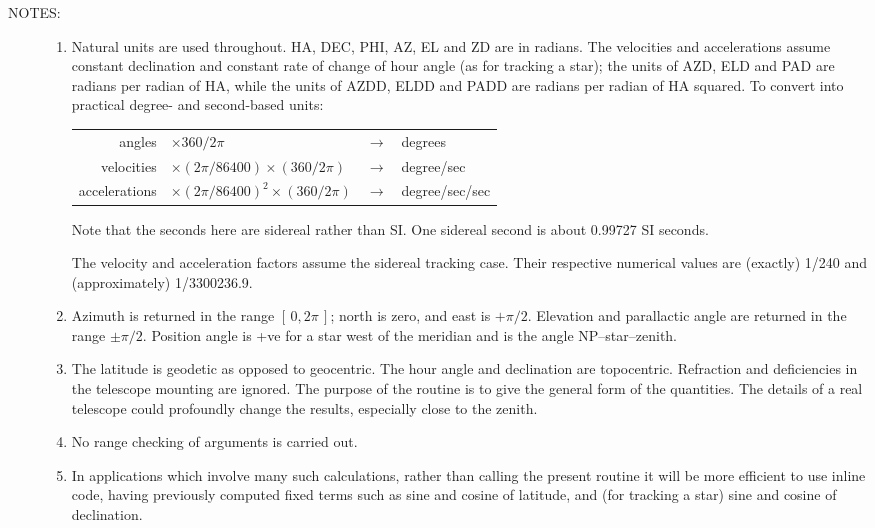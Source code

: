 \documentclass[11pt,twoside]{article}
\newlength{\oldspacing}
\newcommand{\notes}[1]
{
  \goodbreak
  \setlength{\oldspacing}{\topsep}
  \setlength{\topsep}{0.3ex}
  \begin{description}
    \item[NOTES]:
        #1
  \end{description}
  \setlength{\topsep}{\oldspacing}
}
\renewcommand{\notes}[1]
   {
      \begin{description}
         \item[NOTES:]
            #1
      \end{description}
   }
\begin{document}
\notes
{
 \begin{enumerate}
  \setlength{\parskip}{\medskipamount}
  \item Natural units are used throughout.  HA, DEC, PHI, AZ, EL
        and ZD are in radians.  The velocities and accelerations
        assume constant declination and constant rate of change of
        hour angle (as for tracking a star);  the units of AZD, ELD
        and PAD are radians per radian of HA, while the units of AZDD,
        ELDD and PADD are radians per radian of HA squared.  To
        convert into practical degree- and second-based units:

        \begin{center}
        \begin{tabular}{rlcl}
                  angles & $\times 360/2\pi$ & $\rightarrow$ & degrees \\
              velocities & $\times (2\pi/86400) \times (360/2\pi)$
                                             & $\rightarrow$ & degree/sec \\
           accelerations & $\times (2\pi/86400)^2 \times (360/2\pi)$
                                             & $\rightarrow$ & degree/sec/sec \\
        \end{tabular}
        \end{center}

        Note that the seconds here are sidereal rather than SI.  One
        sidereal second is about 0.99727 SI seconds.

        The velocity and acceleration factors assume the sidereal
        tracking case.  Their respective numerical values are (exactly)
        1/240 and (approximately) 1/3300236.9.
  \item Azimuth is returned in the range $[\,0,2\pi\,]$;  north is zero,
        and east is $+\pi/2$.  Elevation and parallactic angle are
        returned in the range $\pm\pi/2$.  Position angle is +ve
        for a star west of the meridian and is the angle NP--star--zenith.
  \item The latitude is geodetic as opposed to geocentric.  The
        hour angle and declination are topocentric.  Refraction and
        deficiencies in the telescope mounting are ignored.  The
        purpose of the routine is to give the general form of the
        quantities.  The details of a real telescope could profoundly
        change the results, especially close to the zenith.
  \item No range checking of arguments is carried out.
  \item In applications which involve many such calculations, rather
        than calling the present routine it will be more efficient to
        use inline code, having previously computed fixed terms such
        as sine and cosine of latitude, and (for tracking a star)
        sine and cosine of declination.
 \end{enumerate}
}
\end{document}
